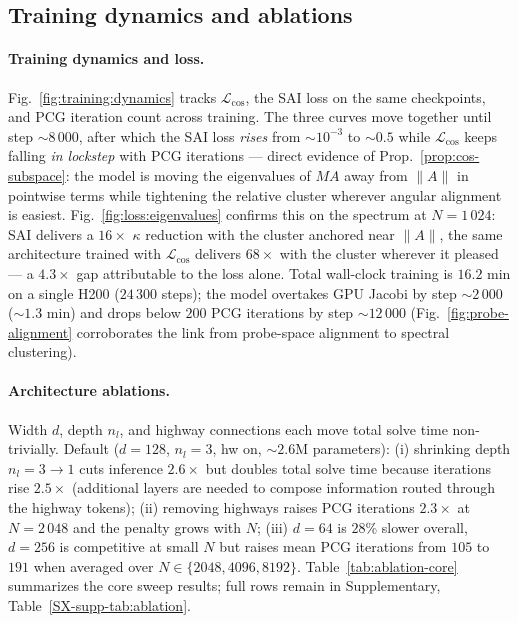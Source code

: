 \documentclass[acmtog]{acmart}
\theoremstyle{plain}
\begin{document}
\subsection{Training dynamics and ablations}
\label{sec:results:training}

\paragraph{Training dynamics and loss.}
Fig.~\ref{fig:training:dynamics} tracks $\mathcal{L}_{\cos}$, the SAI loss on the same
checkpoints, and PCG iteration count across training. The three curves move together
until step $\sim\!8\,000$, after which the SAI loss \emph{rises} from $\sim\!10^{-3}$
to $\sim\!0.5$ while $\mathcal{L}_{\cos}$ keeps falling \emph{in lockstep} with PCG
iterations --- direct evidence of Prop.~\ref{prop:cos-subspace}: the model is moving
the eigenvalues of $MA$ away from $\|A\|$ in pointwise terms while tightening the
relative cluster wherever angular alignment is easiest. Fig.~\ref{fig:loss:eigenvalues}
confirms this on the spectrum at $N\!=\!1\,024$: SAI delivers a $16\times$ $\kappa$
reduction with the cluster anchored near $\|A\|$, the same architecture trained with
$\mathcal{L}_{\cos}$ delivers $68\times$ with the cluster wherever it pleased
--- a $4.3\times$ gap attributable to the loss alone. Total wall-clock training is
$16.2$ min on a single H200 ($24\,300$ steps); the model overtakes GPU Jacobi by
step $\sim\!2\,000$ ($\sim\!1.3$ min) and drops below $200$ PCG iterations by
step $\sim\!12\,000$ (Fig.~\ref{fig:probe-alignment} corroborates
the link from probe-space alignment to spectral clustering).

\paragraph{Architecture ablations.}
Width $d$, depth $n_l$, and highway connections each move total solve time
non-trivially. Default ($d\!=\!128$, $n_l\!=\!3$, hw on, $\sim\!2.6$M parameters):
(i) shrinking depth $n_l\!=\!3\!\to\!1$ cuts inference $2.6\times$ but doubles total
solve time because iterations rise $2.5\times$ (additional layers are needed to
compose information routed through the highway tokens); (ii) removing highways raises
PCG iterations $2.3\times$ at $N\!=\!2\,048$ and the penalty grows with $N$; (iii)
$d\!=\!64$ is $28\%$ slower overall, $d\!=\!256$ is competitive at small $N$ but
raises mean PCG iterations from $105$ to $191$ when averaged over
$N\!\in\!\{2048,4096,8192\}$. Table~\ref{tab:ablation-core} summarizes
the core sweep results; full rows remain in Supplementary, Table~\ref{SX-supp-tab:ablation}.
\end{document}
